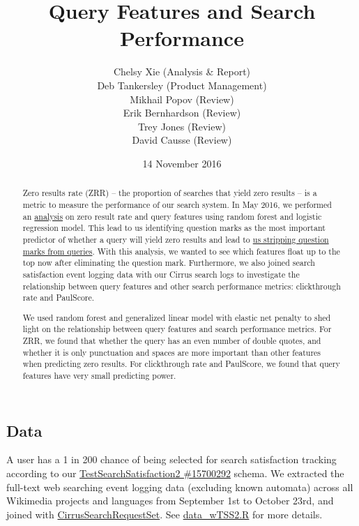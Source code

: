 \documentclass[12pt,]{article}
\title{Query Features and Search Performance}
\author{Chelsy Xie (Analysis \& Report) \\ Deb Tankersley (Product Management) \\ Mikhail Popov (Review) \\ Erik Bernhardson (Review) \\ Trey Jones (Review) \\ David Causse (Review)}
\date{14 November 2016}
\begin{document}
\maketitle

\renewcommand{\abstractname}{Executive Summary}

\begin{abstract}
Zero results rate (ZRR) -- the proportion of searches that yield zero results -- is a metric to measure the performance of our search system. In May 2016, we performed an \href{https://commons.wikimedia.org/wiki/File%3AFrom_Zero_to_Hero_-_Anticipating_Zero_Results_From_Query_Features%2C_Ignoring_Content.pdf}{analysis} on zero result rate and query features using random forest and logistic regression model. This lead to us identifying question marks as the most important predictor of whether a query will yield zero results and lead to \href{https://blog.wikimedia.org/2016/08/11/question-marks-search/}{us stripping question marks from queries}. With this analysis, we wanted to see which features float up to the top now after eliminating the question mark. Furthermore, we also joined search satisfaction event logging data with our Cirrus search logs to investigate the relationship between query features and other search performance metrics: clickthrough rate and PaulScore.

We used random forest and generalized linear model with elastic net penalty to shed light on the relationship between query features and search performance metrics. For ZRR, we found that whether the query has an even number of double quotes, and whether it is only punctuation and spaces are more important than other features when predicting zero results. For clickthrough rate and PaulScore, we found that query features have very small predicting power.
\end{abstract}

\subsection{Data}\label{data}

A user has a 1 in 200 chance of being selected for search satisfaction
tracking according to our
\href{https://meta.wikimedia.org/w/index.php?title=Schema:TestSearchSatisfaction2\&oldid=15700292}{TestSearchSatisfaction2
\#15700292} schema. We extracted the full-text web searching event
logging data (excluding known automata) across all Wikimedia projects
and languages from September 1st to October 23rd, and joined with
\href{https://wikitech.wikimedia.org/wiki/Analytics/Data/Cirrus}{CirrusSearchRequestSet}.
See
\href{https://github.com/wikimedia-research/Discovery-Search-QueryFeatures-201610/blob/master/data_wTSS2.R}{data\_wTSS2.R}
for more details.
\end{document}
